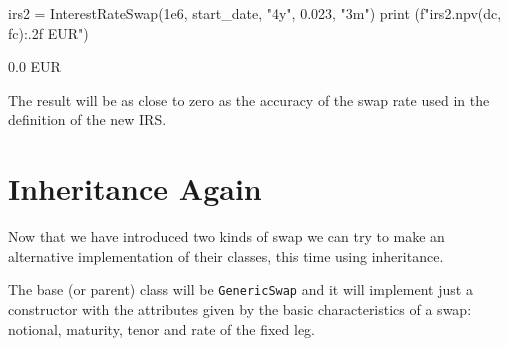 \begin{ipython}
irs2 = InterestRateSwap(1e6, start_date, "4y", 0.023, "3m")
print (f"{irs2.npv(dc, fc):.2f} EUR")
\end{ipython}
\begin{ioutput}
0.0 EUR
\end{ioutput}
\noindent
The result will be as close to zero as the accuracy of the swap rate used in the definition of the new IRS.
   
\section{Inheritance Again}
\begin{finmarkets}
Now that we have introduced two kinds of swap we can try to make an alternative implementation of their classes, this time using inheritance.

The base (or parent) class will be \texttt{GenericSwap} and it will implement just a constructor with the attributes given by the basic characteristics of a swap: notional, maturity, tenor and rate of the fixed leg.
\end{finmarkets}

